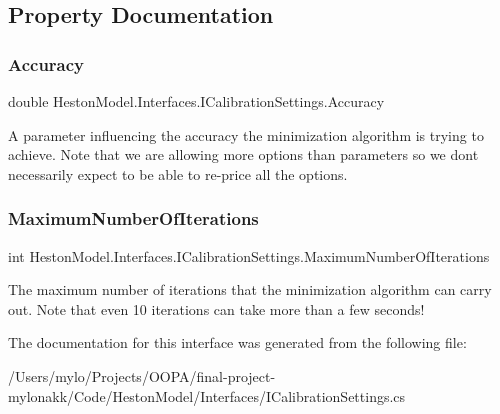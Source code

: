 \subsection{Property Documentation}
\mbox{\label{interface_heston_model_1_1_interfaces_1_1_i_calibration_settings_a08b624ee732fc414a985af4c2fa3549f}} 
\subsubsection{\texorpdfstring{Accuracy}{Accuracy}}
{\footnotesize\ttfamily double Heston\+Model.\+Interfaces.\+I\+Calibration\+Settings.\+Accuracy\hspace{0.3cm}{\ttfamily [get]}}



A parameter influencing the accuracy the minimization algorithm is trying to achieve. Note that we are allowing more options than parameters so we don\textquotesingle{}t necessarily expect to be able to re-\/price all the options. 

\mbox{\label{interface_heston_model_1_1_interfaces_1_1_i_calibration_settings_a191416e60c2f4e0449746c1c205628a5}} 
\subsubsection{\texorpdfstring{Maximum\+Number\+Of\+Iterations}{MaximumNumberOfIterations}}
{\footnotesize\ttfamily int Heston\+Model.\+Interfaces.\+I\+Calibration\+Settings.\+Maximum\+Number\+Of\+Iterations\hspace{0.3cm}{\ttfamily [get]}}



The maximum number of iterations that the minimization algorithm can carry out. Note that even 10 iterations can take more than a few seconds! 



The documentation for this interface was generated from the following file\+:\begin{DoxyCompactItemize}
\item 
/\+Users/mylo/\+Projects/\+O\+O\+P\+A/final-\/project-\/mylonakk/\+Code/\+Heston\+Model/\+Interfaces/I\+Calibration\+Settings.\+cs\end{DoxyCompactItemize}
